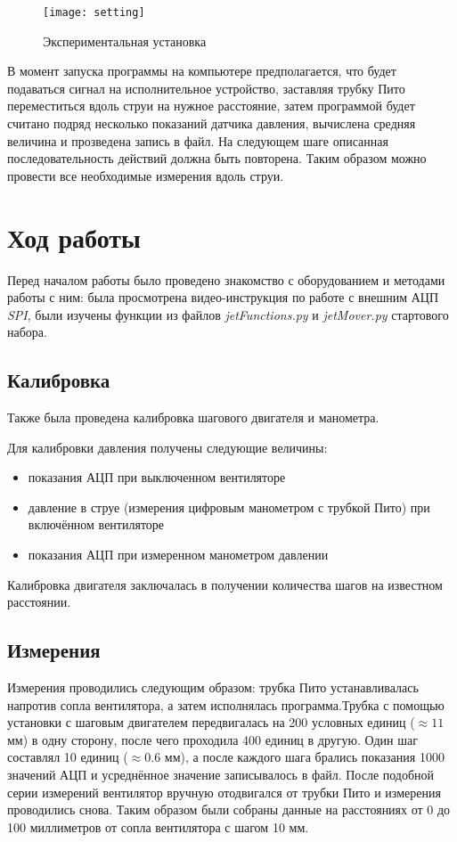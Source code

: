             \begin{figure}
                \centering
                \texttt{[image: setting]}
                \caption{Экспериментальная установка}
                \label{fig:setting}
            \end{figure}

            В момент запуска программы на компьютере предполагается, что будет подаваться сигнал на исполнительное устройство, заставляя трубку Пито переместиться вдоль струи на нужное расстояние, затем программой будет считано подряд несколько показаний датчика давления, вычислена средняя величина и прозведена запись в файл. На следующем шаге описанная последовательность действий должна быть повторена. Таким образом можно провести все необходимые измерения вдоль струи.

    \section{Ход работы}
        Перед началом работы было проведено знакомство с оборудованием и методами работы с ним: была просмотрена видео-инструкция по работе с внешним АЦП \emph{SPI}, были изучены функции из файлов \emph{jetFunctions.py} и \emph{jetMover.py} стартового набора.

        \subsection*{Калибровка}
            Также была проведена калибровка шагового двигателя и манометра.
            
            Для калибровки давления получены следующие величины: 
            \begin{itemize}
                \item показания АЦП при выключенном вентиляторе
                \item давление в струе (измерения цифровым манометром с трубкой Пито) при включённом вентиляторе
                \item показания АЦП при измеренном манометром давлении
            \end{itemize}
            
            Калибровка двигателя заключалась в получении количества шагов на известном расстоянии.
        
        \subsection*{Измерения}
            Измерения проводились следующим образом: трубка Пито устанавливалась напротив сопла вентилятора, а затем исполнялась программа.Трубка с помощью установки с шаговым двигателем передвигалась на 200 условных единиц ($\approx 11$ мм) в одну сторону, после чего проходила 400 единиц в другую. Один шаг составлял 10 единиц ($\approx 0.6$ мм), а после каждого шага брались показания 1000 значений АЦП и усреднённое значение записывалось в файл. После подобной серии измерений вентилятор вручную отодвигался от трубки Пито и измерения проводились снова. Таким образом были собраны данные на расстояниях от 0 до 100 миллиметров от сопла вентилятора с шагом 10 мм.

